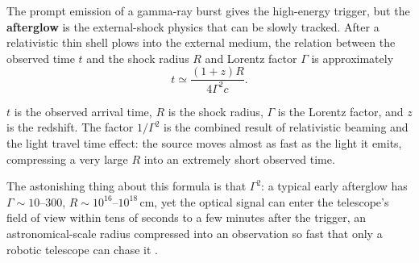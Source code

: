 The prompt emission of a gamma-ray burst gives the high-energy trigger, but the \textbf{afterglow} is the external-shock physics that can be slowly tracked. After a relativistic thin shell plows into the external medium, the relation between the observed time \(t\) and the shock radius \(R\) and Lorentz factor \(\Gamma\) is approximately
\begin{equation}
  t\simeq \frac{(1+z)R}{4\Gamma^2c}.
  \label{eq:e20-grb-arrival-time}
\end{equation}
\begin{formulaexplain}
\(t\) is the observed arrival time, \(R\) is the shock radius, \(\Gamma\) is the Lorentz factor, and \(z\) is the redshift. The factor \(1/\Gamma^2\) is the combined result of relativistic beaming and the light travel time effect: the source moves almost as fast as the light it emits, compressing a very large \(R\) into an extremely short observed time.
\end{formulaexplain}
The astonishing thing about this formula is that \(\Gamma^2\): a typical early afterglow has \(\Gamma\sim10\text{--}300\), \(R\sim10^{16}\text{--}10^{18}\,\mathrm{cm}\), yet the optical signal can enter the telescope's field of view within tens of seconds to a few minutes after the trigger, an astronomical-scale radius compressed into an observation so fast that only a robotic telescope can chase it \citep{1997ApJ...476..232M,1998ApJ...497L..17S,1998Natur.395..670G,1999PhR...314..575P,2004RvMP...76.1143P,2006ARA&A..44..507W}.

